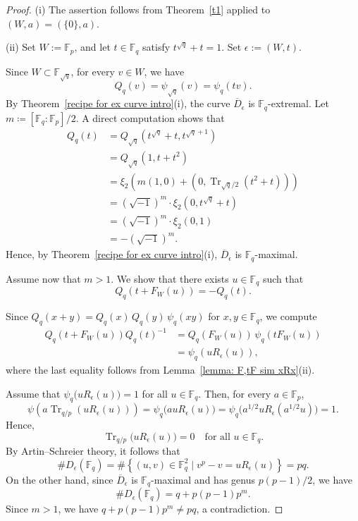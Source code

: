 \documentclass[12pt,a4paper]{amsart}
\theoremstyle{definition}
\def\F{{\mathbb F}}
\theoremstyle{remark}
\DeclareMathOperator{\Tr}{Tr}
\begin{document}
\begin{proof}
(i) The assertion follows from 
Theorem~\ref{t1} applied 
to $(W,a)=(\{0\},a)$. 

\noindent
(ii) Set $W := \F_p$, and 
let $t \in \F_q$ satisfy $t^{\sqrt{q}} + t = 1$. Set $\epsilon:=(W,t)$. 

Since $W\subset\F_{\sqrt{q}}$, for every $v\in W$, we have
\[
Q_q(v)=\psi_{\sqrt{q}}(v)=\psi_q(tv). 
\]
By Theorem~\ref{recipe for ex curve intro}(i), the curve $\overline{D}_{\epsilon}$ is $\F_q$-extremal. 
Let $m\coloneqq [\F_q:\F_p]/2$. 
A direct computation shows that 
\begin{align*}
Q_q(t)
&=Q_{\sqrt{q}}(t^{\sqrt{q}}+t,t^{\sqrt{q}+1})\\
&=Q_{\sqrt{q}}(1,t+t^2)\\
&=\xi_2\!\left(m(1,0)+(0,\Tr_{\sqrt{q}/2}(t^2+t))\right)\\
&=(\sqrt{-1})^{m}\cdot \xi_2(0,t^{\sqrt{q}}+t)\\
&=(\sqrt{-1})^{m}\cdot \xi_2(0,1)\\
&=-(\sqrt{-1})^{m}.
\end{align*}
Hence, by Theorem~\ref{recipe for ex curve intro}(i),
$\overline{D}_{\epsilon}$ is $\F_q$-maximal.





 

Assume now that $m>1$. 
We show that there exists $u \in \F_q$ such that 
\begin{equation}\label{qqt}
Q_q(t + F_W(u)) = - Q_q(t).
\end{equation}

Since $Q_q(x + y) = Q_q(x)\, Q_q(y)\, \psi_q(xy)$ for $x,y \in \F_q$, we compute 
\begin{align*}
Q_q(t + F_W(u))Q_q(t)^{-1}
&= Q_q(F_W(u))\, \psi_q(tF_W(u)) \\
&=  \psi_q(uR_{\epsilon}(u)), 
\end{align*}
where the last equality follows from Lemma~\ref{lemma: F,tF sim  xRx}(ii). 

Assume that $\psi_q\bigl(u R_{\epsilon}(u)\bigr) = 1$ for all $u \in \F_q$. Then, for every $a\in\F_p$, 
\[
\psi(a\Tr_{q/p}(u R_{\epsilon}(u)))=
\psi_q\bigl(au R_{\epsilon}(u)\bigr) =\psi_q\bigl(a^{1/2}u R_{\epsilon}(a^{1/2}u)\bigr) = 1. 
\]
Hence, 
\[
\Tr_{q/p}\bigl(u R_{\epsilon}(u)\bigr) = 0
\quad \text{for all } u \in \F_q.
\]
By Artin--Schreier theory, it follows that 
\[
\# D_{\epsilon}(\F_q) =\# \left\{(u,v) \in \F_q^2 \mid 
v^p-v=u R_{\epsilon}(u)\right\}=pq. 
\]
On the other hand, since $\overline{D}_\epsilon$ is $\F_q$-maximal and has genus $p(p-1)/2$, we have 
\[
\# D_{\epsilon}(\F_q) = q + p(p-1)p^m. 
\]
Since $m > 1$, we have $q + p(p-1)p^m\neq pq$, a contradiction. 


\end{proof}
\end{document}
